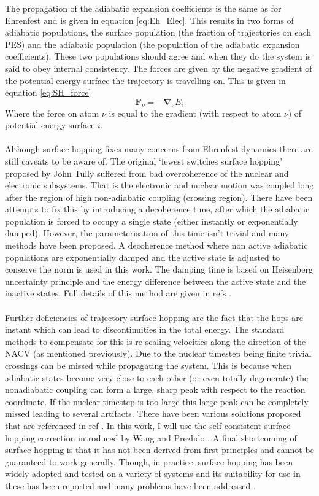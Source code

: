 The propagation of the adiabatic expansion coefficients is the same as for Ehrenfest and is given in equation \eqref{eq:Eh_Elec}. This results in two forms of adiabatic populations, the surface population (the fraction of trajectories on each PES) and the adiabatic population (the population of the adiabatic expansion coefficients). These two populations should agree and when they do the system is said to obey internal consistency. The forces are given by the negative gradient of the potential energy surface the trajectory is travelling on. This is given in equation \eqref{eq:SH_force}
\begin{equation}
	\mathbf{F}_{\nu} = -\mathbf{\nabla}_{\nu} E_{i} 
  \label{eq:SH_force}
\end{equation}
Where the force on atom $\nu$ is equal to the gradient (with respect to atom $\nu$) of potential energy surface $i$.
\\\\
Although surface hopping fixes many concerns from Ehrenfest dynamics there are still caveats to be aware of. The original `fewest switches surface hopping' proposed by John Tully suffered from bad overcoherence of the nuclear and electronic subsystems. That is the electronic and nuclear motion was coupled long after the region of high non-adiabatic coupling (crossing region). There have been attempts to fix this by introducing a decoherence time, after which the adiabatic population is forced to occupy a single state (either instantly or exponentially damped). However, the parameterisation of this time isn't trivial and many methods have been proposed. A decoherence method where non active adiabatic populations are exponentially damped and the active state is adjusted to conserve the norm is used in this work. The damping time is based on Heisenberg uncertainty principle and the energy difference between the active state and the inactive states. Full details of this method are given in refs \cite{Giannini2018Crossover, Carof2017FSSH}.
\\\\
Further deficiencies of trajectory surface hopping are the fact that the hops are instant which can lead to discontinuities in the total energy. The standard methods to compensate for this is re-scaling velocities along the direction of the NACV (as mentioned previously). Due to the nuclear timestep being finite trivial crossings can be missed while propagating the system. This is because when adiabatic states become very close to each other (or even totally degenerate) the nonadiabatic coupling can form a large, sharp peak with respect to the reaction coordinate. If the nuclear timestep is too large this large peak can be completely missed leading to several artifacts. There have been various solutions proposed that are referenced in ref \cite{Carof2017FSSH, Wang2016}. In this work, I will use the self-consistent surface hopping correction introduced by Wang and Prezhdo \cite{Wang2014}.  A final shortcoming of surface hopping is that it has not been derived from first principles and cannot be guaranteed to work generally. Though, in practice, surface hopping has been widely adopted and tested on a variety of systems and its suitability for use in these has been reported and many problems have been addressed \cite{Wang2016}.
